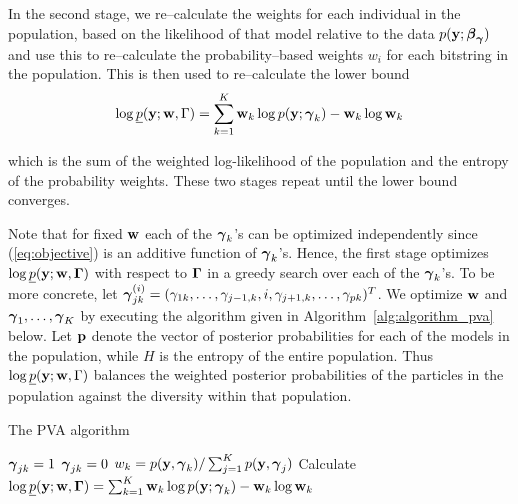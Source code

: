 In the second stage, we re--calculate the weights for each individual in the
population, based on the likelihood of that model relative to the data $p({\bf y};
{\boldsymbol \beta}_{\boldsymbol \gamma})$ and use this to re--calculate the probability--based weights
$w_i$ for each bitstring in the population. This is then used to re--calculate
the lower bound
\[
	\log \underline{p}({\bf y}; {\bf w}, \Gamma) = \sum_{k=1}^K {\bf w}_k \log p({\bf y}; {{\boldsymbol \gamma}_k}) - {\bf w}_k \log {\bf w}_k
\]

\noindent 
which is the sum of the weighted log-likelihood of the population and the
entropy of the probability weights.  These two stages repeat until the lower
bound converges.

Note that for fixed ${\bf w}$ each of the ${\boldsymbol \gamma}_k$'s can be optimized
independently since (\ref{eq:objective}) is an additive function of
${\boldsymbol \gamma}_k$'s. Hence, the first stage optimizes $\log
\underline{p}({\bf y};{\bf w},{\boldsymbol \Gamma})$ with respect to ${\boldsymbol \Gamma}$ in a greedy search
over each of the  ${\boldsymbol \gamma}_k$'s.  To be more concrete, let ${\boldsymbol \gamma}_{jk}^{(i)}
= (\gamma_{1k},\ldots,\gamma_{j-1,k},i,\gamma_{j+1,k},\ldots,\gamma_{pk})^T$.
We optimize ${\bf w}$ and ${\boldsymbol \gamma}_1,\ldots,{\boldsymbol \gamma}_K$ by executing the algorithm
given in Algorithm~\ref{alg:algorithm_pva} below. Let ${\bf p}$ denote the vector
of posterior probabilities for each of the models  in the population, while $H$
is the entropy of the entire population. Thus $\log \underline{p}({\bf y}; {\bf w}, \Gamma)$ balances the weighted
posterior  probabilities of the particles in the population against the
diversity within that population.

\begin{algorithm}\label{alg:updateGamma}
	\caption{The PVA algorithm}
	\label{alg:algorithm_pva}
	\begin{algorithmic}
		\medskip 
		\medskip
				\medskip
					\medskip
						\medskip
						\STATE ${\boldsymbol \gamma}_{jk} = 1$
					\ELSE
					\medskip
						\STATE ${\boldsymbol \gamma}_{jk} = 0$
					\ENDIF
				\ENDFOR
				\medskip
				\STATE $w_k = p({\bf y}, {\boldsymbol \gamma}_k) / \sum_{j=1}^K p({\bf y}, {\boldsymbol \gamma}_j)$
			\ENDFOR
			\medskip
			\STATE Calculate $\log \underline{p}({\bf y}; {\bf w}, {\boldsymbol \Gamma}) = \sum_{k=1}^K {\bf w}_k \log p({\bf y}; {{\boldsymbol \gamma}_k}) - {\bf w}_k \log {\bf w}_k$
		\ENDWHILE
	\end{algorithmic}
\end{algorithm}

